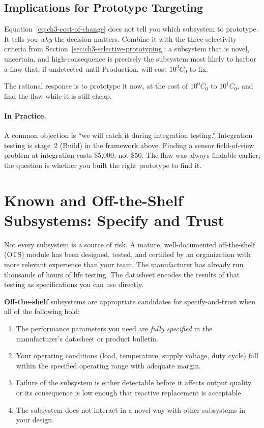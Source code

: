 \subsection{Implications for Prototype Targeting}

Equation~\eqref{eq:ch3-cost-of-change} does not tell you which subsystem to
prototype.
It tells you \emph{why} the decision matters.
Combine it with the three selectivity criteria from
Section~\ref{sec:ch3-selective-prototyping}: a subsystem that is novel,
uncertain, and high-consequence is precisely the subsystem most likely to
harbor a flaw that, if undetected until Production, will cost $10^3 C_0$ to
fix.

The rational response is to prototype it now, at the cost of
$10^0 C_0$ to $10^1 C_0$, and find the flaw while it is still cheap.

\paragraph{In Practice.}
A common objection is ``we will catch it during integration testing.''
Integration testing is stage~2 (Build) in the framework above.
Finding a sensor field-of-view problem at integration costs \$5{,}000, not
\$50.
The flaw was always findable earlier; the question is whether you built the
right prototype to find it.


\section{Known and Off-the-Shelf Subsystems: Specify and Trust}
\label{sec:ch3-specify-and-trust}

Not every subsystem is a source of risk.
A mature, well-documented off-the-shelf (OTS) module has been designed,
tested, and certified by an organization with more relevant experience than
your team.
The manufacturer has already run thousands of hours of life testing.
The datasheet encodes the results of that testing as specifications you can
use directly.

\textbf{Off-the-shelf} subsystems are appropriate
candidates for specify-and-trust when all of the following hold:

\begin{enumerate}
  \item The performance parameters you need are \emph{fully specified} in the
        manufacturer's datasheet or product bulletin.
  \item Your operating conditions (load, temperature, supply voltage,
        duty cycle) fall within the specified operating range with adequate
        margin.
  \item Failure of the subsystem is either detectable before it affects output
        quality, or its consequence is low enough that reactive replacement is
        acceptable.
  \item The subsystem does not interact in a novel way with other subsystems
        in your design.
\end{enumerate}

